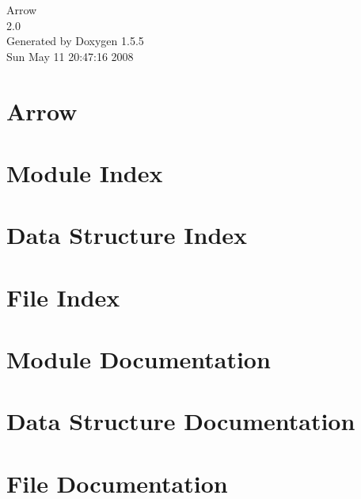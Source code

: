 \documentclass[a4paper]{book}
\begin{document}
\begin{titlepage}
\vspace*{7cm}
\begin{center}
{\Large Arrow \\[1ex]\large 2.0 }\\
\vspace*{1cm}
{\large Generated by Doxygen 1.5.5}\\
\vspace*{0.5cm}
{\small Sun May 11 20:47:16 2008}\\
\end{center}
\end{titlepage}
\clearemptydoublepage
{}
\tableofcontents
\clearemptydoublepage
{}
\chapter{Arrow }
\label{index}\hypertarget{index}{}
\chapter{Module Index}

\chapter{Data Structure Index}

\chapter{File Index}

\chapter{Module Documentation}


\chapter{Data Structure Documentation}







\chapter{File Documentation}









\printindex
\end{document}
